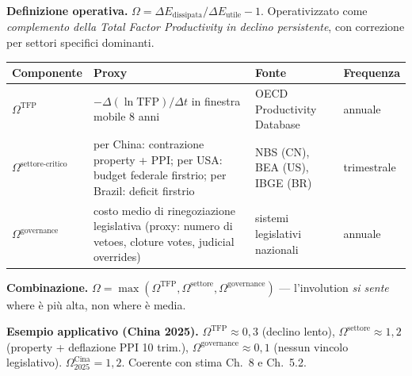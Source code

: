 \Hypoth{} \textbf{Definizione operativa.}
\(\Omega = \Delta E_{\text{dissipata}}/\Delta E_{\text{utile}} - 1\).
Operativizzato come \emph{complemento della Total Factor Productivity in
declino persistente}, con correzione per settori specifici dominanti.

{\def\LTcaptype{none} %
{\small\begin{longtable}[]{@{}
  >{\raggedright\arraybackslash}p{}
  >{\raggedright\arraybackslash}p{}
  >{\raggedright\arraybackslash}p{}
  >{\raggedright\arraybackslash}p{}@{}}
\toprule\noalign{}
\begin{minipage}[b]{\linewidth}\raggedright
Componente
\end{minipage} & \begin{minipage}[b]{\linewidth}\raggedright
Proxy
\end{minipage} & \begin{minipage}[b]{\linewidth}\raggedright
Fonte
\end{minipage} & \begin{minipage}[b]{\linewidth}\raggedright
Frequenza
\end{minipage} \\
\midrule\noalign{}
\endhead
\bottomrule\noalign{}
\endlastfoot
\(\Omega^{\text{TFP}}\) & \(-\Delta(\ln \text{TFP})/\Delta t\) in
finestra mobile 8 anni & OECD Productivity Database & annuale \\
\(\Omega^{\text{settore-critico}}\) & per China: contrazione property +
PPI; per USA: budget federale firstrio; per Brazil: deficit firstrio &
NBS (CN), BEA (US), IBGE (BR) & trimestrale \\
\(\Omega^{\text{governance}}\) & costo medio di rinegoziazione
legislativa (proxy: numero di vetoes, cloture votes, judicial overrides)
& sistemi legislativi nazionali & annuale \\
\end{longtable}}
}

\Proved{} \textbf{Combinazione.}
\(\Omega = \max(\Omega^{\text{TFP}}, \Omega^{\text{settore}}, \Omega^{\text{governance}})\)
--- l'involution \emph{si sente} where è più alta, non where è media.

\Hypoth{} \textbf{Esempio applicativo (China 2025).}
\(\Omega^{\text{TFP}} \approx 0{,}3\) (declino lento),
\(\Omega^{\text{settore}} \approx 1{,}2\) (property + deflazione PPI 10
trim.), \(\Omega^{\text{governance}} \approx 0{,}1\) (nessun vincolo
legislativo). \(\Omega^{\text{Cina}}_{2025} = 1{,}2\). Coerente con
stima Ch.~8 e Ch.~5.2.



